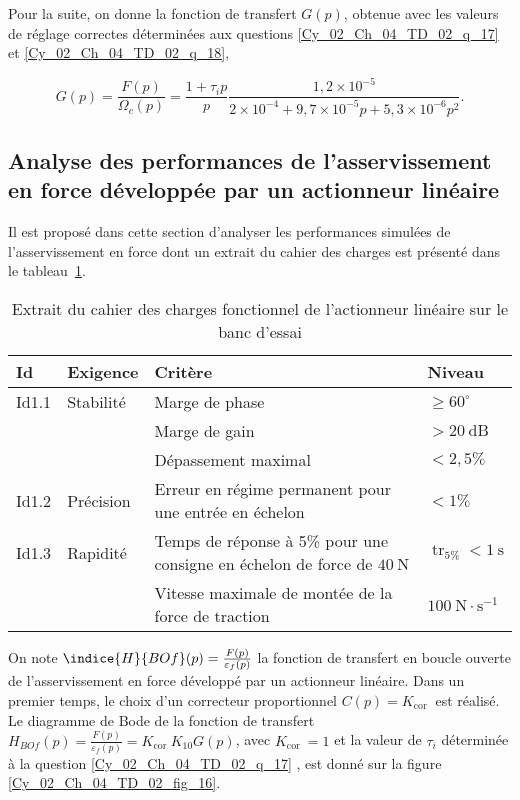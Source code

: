 Pour la suite, on donne la fonction de transfert $G(p)$, obtenue avec les valeurs de réglage correctes déterminées aux questions \ref{Cy_02_Ch_04_TD_02_q_17} et \ref{Cy_02_Ch_04_TD_02_q_18},

$$
G(p)=\frac{F(p)}{\Omega_{c}(p)}=\frac{1+\tau_{i} p}{p} \frac{1,2 \times 10^{-5}}{2 \times 10^{-4}+9,7 \times 10^{-5} p+5,3 \times 10^{-6} p^{2}} .
$$

\subsection*{Analyse des performances de l'asservissement en force développée par un actionneur linéaire}
\ifprof
\else
Il est proposé dans cette section d'analyser les performances simulées de l'asservissement en force dont un extrait du cahier des charges est présenté dans le tableau~\ref{Cy_02_Ch_04_TD_02_tab_05}.

\begin{table}[!h]
\begin{tabular}{llp{7cm}l}
\hline
\textbf{Id} & \textbf{Exigence} & \textbf{Critère} & \textbf{Niveau} \\
\hline
Id1.1 & Stabilité & Marge de phase & $\geqslant 60^{\circ}$ \\
 &  & Marge de gain & $>20 \mathrm{~dB}$ \\
 &  & Dépassement maximal & $<2,5 \%$ \\
Id1.2 & Précision & Erreur en régime permanent pour une entrée en échelon & $<1 \%$ \\
Id1.3 & Rapidité & Temps de réponse à 5\% pour une consigne en échelon de force de $40 \mathrm{~N}$ & $\operatorname{tr}_{5 \%}<1 \mathrm{~s}$ \\
 &  & Vitesse maximale de montée de la force de traction & $100 \mathrm{~N} \cdot \mathrm{s}^{-1}$ \\
\hline
\end{tabular}
\caption{Extrait du cahier des charges fonctionnel de l'actionneur linéaire sur le banc d'essai \label{Cy_02_Ch_04_TD_02_tab_05}}
\end{table}

On note $\indice{H}{BO f}(p)=\frac{F(p)}{\varepsilon_{f}(p)}$ la fonction de transfert en boucle ouverte de l'asservissement en force développé par un actionneur linéaire. Dans un premier temps, le choix d'un correcteur proportionnel $C(p)=K_{\text {cor }}$ est réalisé. Le diagramme de Bode de la fonction de transfert $H_{B O f}(p)=\frac{F(p)}{\varepsilon_{f}(p)}=K_{\text {cor }} K_{10} G(p)$, avec $K_{\text {cor }}=1$ et la valeur de $\tau_{i}$ déterminée à la question \ref{Cy_02_Ch_04_TD_02_q_17} , est donné sur la figure \ref{Cy_02_Ch_04_TD_02_fig_16}.\\


